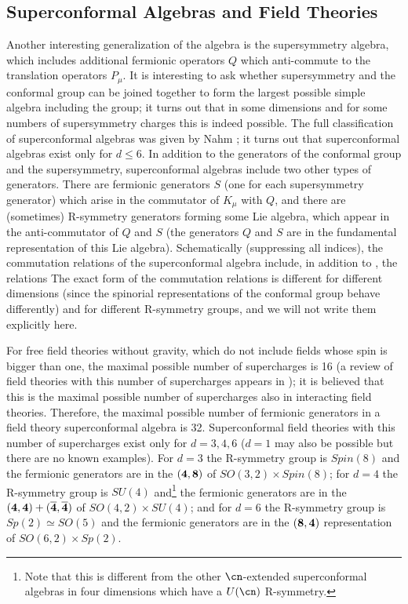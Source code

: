 \subsection{Superconformal Algebras and Field Theories}
\label{superconfalg}

Another interesting generalization of the \Poincare algebra is the
supersymmetry algebra, which includes additional fermionic operators
$Q$ which anti-commute to the translation operators $P_\mu$. It is
interesting to ask whether supersymmetry and the conformal group can
be joined together to form the largest possible simple algebra
including the \Poincare group; it turns out that in some dimensions and
for some numbers of supersymmetry charges this is indeed
possible. The full classification of superconformal algebras was
given by Nahm \cite{Nahm:1978tg}; 
it turns out that superconformal algebras exist
only for $d\leq 6$. In addition to the generators of the conformal
group and the supersymmetry, superconformal algebras include two other
types of generators. There are fermionic generators $S$ (one for each
supersymmetry generator) which arise in the commutator of $K_\mu$ with
$Q$, and there are (sometimes) R-symmetry generators forming some Lie
algebra, which appear in the anti-commutator of $Q$ and
$S$ (the generators $Q$ and $S$ are in the fundamental representation
of this Lie algebra). 
Schematically (suppressing all indices), 
the commutation relations of the superconformal
algebra include, in addition to , the relations
The exact form of the commutation relations is different for different
dimensions (since the spinorial representations of the conformal group
behave differently) and for different R-symmetry groups,
and we will not write them explicitly here.

For free field theories without gravity, which do not include fields
whose spin is bigger than one, the maximal possible number of
supercharges is 16 (a review of field theories with this number of
supercharges appears in \cite{Seiberg:1997ax}); it is believed that
this is the maximal possible number of supercharges also in
interacting field theories. Therefore, the maximal possible number of
fermionic generators in a field theory superconformal algebra is
32. Superconformal field theories with this number of supercharges
exist only for $d=3,4,6$ ($d=1$ may also be possible but there are no
known examples). For $d=3$ the R-symmetry group is $Spin(8)$ and the
fermionic generators are in the $\bf(4,8)$ of $SO(3,2)\times Spin(8)$;
for $d=4$ the R-symmetry group is $SU(4)$ and\footnote{Note that this
is different from the other $\cn$-extended superconformal algebras in
four dimensions which have a $U(\cn)$ R-symmetry.} the fermionic
generators are in the $\bf(4,4)+\bf({\overline 4},{\overline 4})$ of
$SO(4,2)\times SU(4)$; and for $d=6$ the R-symmetry group is
$Sp(2)\simeq SO(5)$ and the fermionic generators are in the $\bf(8,4)$
representation of $SO(6,2)\times Sp(2)$.


